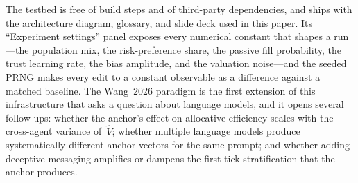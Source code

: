 The testbed is free of build steps and of third-party dependencies,
and ships with the architecture diagram, glossary, and slide deck
used in this paper. Its ``Experiment settings'' panel exposes every
numerical constant that shapes a run---the population mix, the
risk-preference share, the passive fill probability, the trust
learning rate, the bias amplitude, and the valuation noise---and
the seeded PRNG makes every edit to a constant observable as a
difference against a matched baseline. The Wang~2026 paradigm is
the first extension of this infrastructure that asks a question
about language models, and it opens several follow-ups: whether
the anchor's effect on allocative efficiency scales with the
cross-agent variance of~$\hat V$; whether multiple language models
produce systematically different anchor vectors for the same
prompt; and whether adding deceptive messaging amplifies or dampens
the first-tick stratification that the anchor produces.
